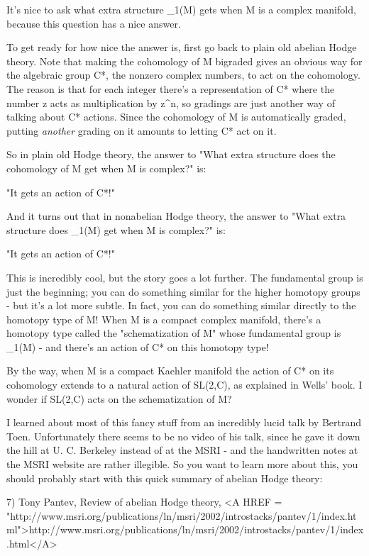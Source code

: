 It's nice to ask what extra structure \Pi _{1}(M) gets when M is 
a complex manifold, because this question has a nice answer.

To get ready for how nice the answer is, first go back to plain old
abelian Hodge theory.  Note that making the cohomology of M bigraded
gives an obvious way for the algebraic group C*, the nonzero complex
numbers, to act on the cohomology.  The reason is that for each integer
there's a representation of C* where the number z acts as multiplication
by z^{n}, so gradings are just another way of talking about C* actions.
Since the cohomology of M is automatically graded, putting \emph{another}
grading on it amounts to letting C* act on it.

So in plain old Hodge theory, the answer to "What extra structure
does the cohomology of M get when M is complex?" is: 

"It gets an action of C*!"

And it turns out that in nonabelian Hodge theory, the answer to
"What extra structure does \Pi _{1}(M) get when M is
complex?" is:

"It gets an action of C*!"

This is incredibly cool, but the story goes a lot further.  The
fundamental group is just the beginning; you can do something similar
for the higher homotopy groups - but it's a lot more subtle.  In fact,
you can do something similar directly to the homotopy type of M!  When M
is a compact complex manifold, there's a homotopy type called the
"schematization of M" whose fundamental group is
\Pi _{1}(M) - and there's an action of C* on this homotopy type!

By the way, when M is a compact Kaehler manifold the action of 
C* on its cohomology extends to a natural action of SL(2,C), as 
explained in Wells' book.  I wonder if SL(2,C) acts on the schematization 
of M?

I learned about most of this fancy stuff from an incredibly lucid
talk by Bertrand Toen.  Unfortunately there seems to be no video of his 
talk, since he gave it down the hill at U. C. Berkeley instead of at
the MSRI - and the handwritten notes at the MSRI website are rather
illegible.  So you want to learn more about this, you should probably
start with this quick summary of abelian Hodge theory:

7) Tony Pantev, Review of abelian Hodge theory, 
<A HREF = "http://www.msri.org/publications/ln/msri/2002/introstacks/pantev/1/index.html">http://www.msri.org/publications/ln/msri/2002/introstacks/pantev/1/index.html</A>

